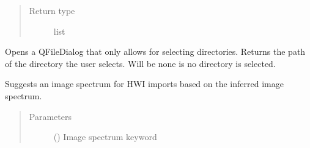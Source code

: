 \documentclass[letterpaper,10pt,english]{sphinxmanual}
\begin{document}
\begin{fulllineitems}
\begin{fulllineitems}
\begin{quote}
\begin{description}
\item[{Return type}] \leavevmode
list

\end{description}\end{quote}

\end{fulllineitems}


\begin{fulllineitems}
\label{\detokenize{polo.windows:polo.windows.run_importer_dialog.RunImporterDialog.open_run_browser}}
Opens a QFileDialog that only allows for selecting directories.
Returns the path of the directory the user selects. Will be none
is no directory is selected.

\end{fulllineitems}


\begin{fulllineitems}
\label{\detokenize{polo.windows:polo.windows.run_importer_dialog.RunImporterDialog.set_current_menu}}
\end{fulllineitems}


\begin{fulllineitems}
\label{\detokenize{polo.windows:polo.windows.run_importer_dialog.RunImporterDialog.set_hwi_image_type}}
Suggests an image spectrum for HWI imports based on the
inferred image spectrum.
\begin{quote}\begin{description}
\item[{Parameters}] \leavevmode
{} () \textendash{} Image spectrum keyword


\end{description}
\end{quote}
\end{fulllineitems}
\end{fulllineitems}
\end{document}
